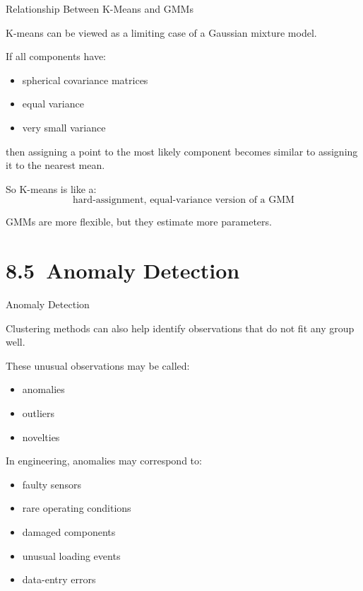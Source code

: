 \documentclass[aspectratio=169]{beamer}
\begin{document}

\begin{frame}{Relationship Between K-Means and GMMs}

K-means can be viewed as a limiting case of a Gaussian mixture model.

\vspace{0.8em}

If all components have:
\begin{itemize}
\item spherical covariance matrices
\item equal variance
\item very small variance
\end{itemize}

then assigning a point to the most likely component becomes similar to assigning it to the nearest mean.

\vspace{0.8em}

So K-means is like a:
\[
\text{hard-assignment, equal-variance version of a GMM}
\]

\vspace{0.5em}

GMMs are more flexible, but they estimate more parameters.

\end{frame}


\section{8.5~Anomaly Detection}

\begin{frame}{Anomaly Detection}

Clustering methods can also help identify observations that do not fit any group well.

\vspace{0.8em}

These unusual observations may be called:
\begin{itemize}
\item anomalies
\item outliers
\item novelties
\end{itemize}

\vspace{0.8em}

In engineering, anomalies may correspond to:
\begin{itemize}
\item faulty sensors
\item rare operating conditions
\item damaged components
\item unusual loading events
\item data-entry errors
\end{itemize}

\end{frame}
\end{document}
